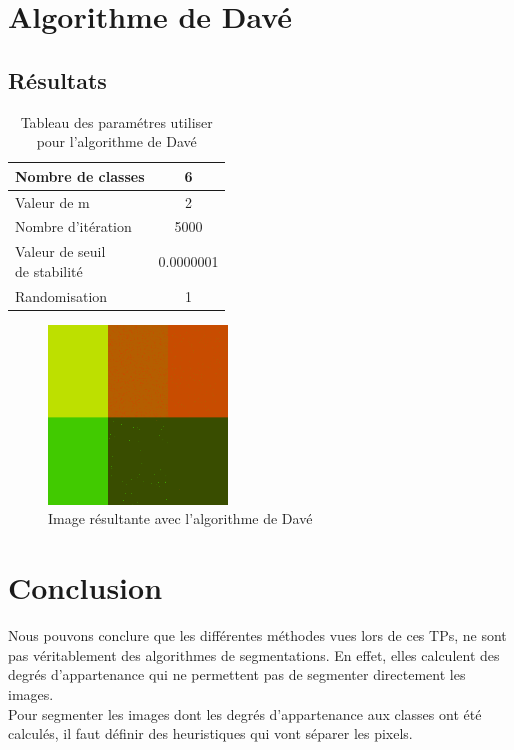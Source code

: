 \documentclass[a4paper,11pt]{article}
\begin{document}
\section{Algorithme de Davé}

\subsection{Résultats}

\begin{table}[H]
  \begin{center}
    \begin{tabular}{|l|c|}
      \hline
      Nombre de classes & 6 \\
      \hline
      Valeur de m & 2 \\
      \hline
      Nombre d'itération & 5000 \\
      \hline
      \shortstack{ Valeur de seuil \\ de stabilité }  & 0.0000001 \\
      \hline
      Randomisation & 1 \\
      \hline
    \end{tabular}
    \caption{Tableau des paramétres utiliser pour l'algorithme de Davé}
  \end{center}
\end{table}


\begin{figure}[H]
  \begin{center} 
    \includegraphics[width=180px]{../img/segDave.png}
    \caption{Image résultante avec l'algorithme de Davé}
  \end{center}
\end{figure}

\section*{Conclusion}

Nous pouvons conclure que les différentes méthodes vues lors de ces TPs, ne sont 
pas véritablement des algorithmes de segmentations. En effet, elles calculent 
des degrés d'appartenance qui ne permettent pas de segmenter directement les 
images.\\

Pour segmenter les images dont les degrés d'appartenance aux classes ont été calculés,
il faut définir des heuristiques qui vont séparer les pixels.\\
\end{document}
